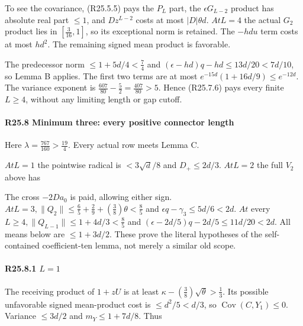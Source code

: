 To see the covariance, (R25.5.5) pays the \(P_L\) part, the \(\epsilon G_{L-2}\) product has absolute real part \(\le 1\), and \(D z^{L-2}\) costs at most \(\lvert D\rvert \theta d\). \(At L=4\) the actual \(G_{2}\) product lies in \([\frac{3}{16},\allowbreak \allowbreak 1]\), so its exceptional norm is retained. The \(-hd u\) term costs at most \(h d^2\). The remaining signed mean product is favorable.

The predecessor norm \(\le 1+5d/4<\frac{7}{4}\) and \((\epsilon-hd)q-hd\le 13d/20<7d/10\), so Lemma B applies. The first two terms are at most \(e^{-15d}(1+16d/9)\le e^{-12d}\). The variance exponent is \(\frac{607}{80}-\frac{5}{2}=\frac{407}{80}>5\). Hence (R25.7.6) pays every finite \(L\ge 4\), without any limiting length or gap cutoff.

\paragraph{R25.8 Minimum three: every positive connector length}

Here \(\lambda=\frac{767}{160}>\frac{19}{4}\). Every actual row meets Lemma C.

\(At L=1\) the pointwise radical is \(<3\sqrt{d}/8\) and \(D_+\le 2d/3\). \(At L=2\) the full \(V_{2}\) above has


The cross \(-2D a_0\) is paid, allowing either sign. \(At L=3,\allowbreak \allowbreak  \lVert Q_{2}\rVert \le \frac{6}{5}+\frac{2}{9}+(\frac{3}{8})\theta<\frac{8}{5}\) and \(\epsilon q-\gamma_{3}\le 5d/6<2d\). \(At\) every \(L\ge 4,\allowbreak \allowbreak  \lVert Q_{L-1}\rVert \le 1+4d/3<\frac{8}{5}\) and \((\epsilon-2d/5)q-2d/5\le 11d/20<2d\). All means below are \(\le 1+3d/2\). These prove the literal hypotheses of the self-contained coefficient-ten lemma, not merely a similar old scope.

\paragraph{R25.8.1 \(L=1\)}

The receiving product of \(1+zU\) is at least \(\kappa-(\frac{3}{8})\sqrt{\theta}>\frac{1}{3}\). Its possible unfavorable signed mean-product cost is \(\le d^2/5<d/3\), so \(\operatorname{Cov}(C,\allowbreak \allowbreak Y_{1})\le 0\). Variance \(\le 3d/2\) and \(m_Y\le 1+7d/8\). Thus

